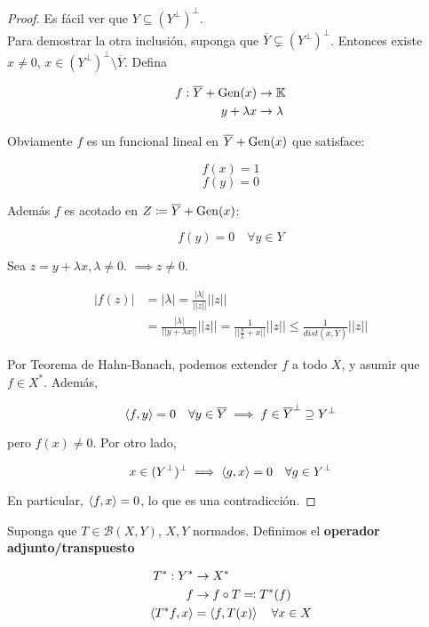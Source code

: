  \begin{proof}
    Es fácil ver que $Y\subseteq (Y^\perp)^\perp$.\\
    Para demostrar la otra inclusión, suponga que $\overline{Y}\subsetneq (Y^\perp)^\perp$. Entonces existe $x\neq 0$, $x\in (Y^\perp)^\perp\setminus \overline{Y}$. Defina

    \begin{align*}
        f:\overline{Y}+\operatorname{Gen}(x)&\to\mathbb{K}\\
        y+\lambda x&\to \lambda
    \end{align*}

    Obviamente $f$ es un funcional lineal en $\overline{Y}+\operatorname{Gen}(x)$ que satisface:

    \[f(x)=1\]
    \[f(y)=0\]

    Además $f$ es acotado en $Z\coloneqq \overline{Y}+\operatorname{Gen}(x)$:

    \[f(y)=0\quad\forall y\in Y\]

    Sea $z=y+\lambda x,\lambda\neq 0$. $\implies z\neq 0$.

    \begin{align*}
        |f(z)|&=|\lambda|=\frac{|\lambda|}{||z||}||z||\\
        &=\frac{|\lambda|}{||y+\lambda x||}||z||=\frac{1}{||\frac{y}{\lambda}+x||}||z||\leq \frac{1}{dist(x,\overline{Y})}||z||
    \end{align*}

    Por Teorema de Hahn-Banach, podemos extender $f$ a todo $X$, y asumir que $f\in X^*$. Además,

    \[\left\langle f,y\right\rangle=0\quad\forall y\in \overline{Y}\implies f\in \overline{Y}^\perp\supseteq Y^\perp\]

    pero $f(x)\neq 0$. Por otro lado, 

    \[x\in (Y^\perp)^\perp\implies \left\langle g,x\right\rangle=0\quad\forall g\in Y^\perp\]

    En particular, $\left\langle f,x\right\rangle=0$, lo que es una contradicción.
 \end{proof}

 Suponga que $T\in \mathcal{B}(X,Y)$, $X,Y$ normados. Definimos el \textbf{operador adjunto/transpuesto}

 \begin{align*}
    T^*:Y^*&\to X^*\\
    f&\to f\circ T\eqqcolon T^*(f)\\
    \left\langle T^*f,x\right\rangle&=\left\langle f,T(x)\right\rangle\quad\forall x\in X
 \end{align*}

